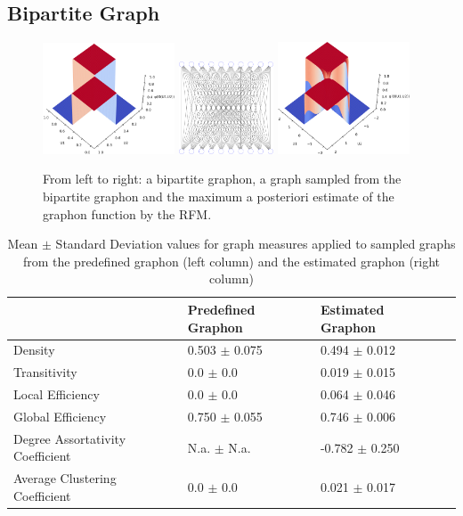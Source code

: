\documentclass[11pt]{report} %
\begin{document}
\subsection{Bipartite Graph}
\begin{figure}[H]
    \center
    \includegraphics[width= 0.35\textwidth]{bipartitegraphon}%
    \hfill
    \includegraphics[width= 0.25\textwidth]{bipartitegraph}%
    \hfill
    \includegraphics[width= 0.35\textwidth]{provengraphonnogrid}%
    \caption{From left to right: a bipartite graphon, a graph sampled from the bipartite graphon and the maximum a posteriori estimate of the graphon function by the RFM.}
    \label{estimatedbipartitegraphon}
\end{figure}

\begin{table}[h]
\caption{Mean $\pm$ Standard Deviation values for graph measures applied to sampled graphs from the predefined graphon (left column) and the estimated graphon (right column)}
\begin{tabular}{|l|l|l|l|}
\hline
 & \textbf{Predefined Graphon} & \textbf{Estimated Graphon}  \\ \hline
 Density & 0.503 $\pm$ 0.075 & 0.494 $\pm$ 0.012 \\ \hline
 Transitivity & 0.0 $\pm$ 0.0 & 0.019 $\pm$ 0.015 \\ \hline
Local Efficiency &  0.0 $\pm$ 0.0  & 0.064 $\pm$ 0.046 \\ \hline
Global Efficiency & 0.750 $\pm$ 0.055 & 0.746 $\pm$  0.006\\ \hline
Degree Assortativity Coefficient & N.a. $\pm$ N.a. &  -0.782 $\pm$ 0.250 \\ \hline
Average Clustering Coefficient & 0.0 $\pm$ 0.0 &  0.021 $\pm$ 0.017 \\ \hline
\end{tabular}
\end{table}
\end{document}
